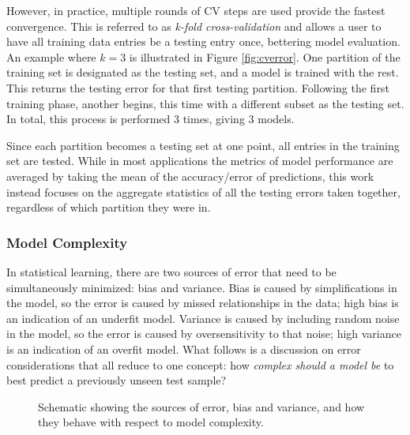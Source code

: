 However, in practice, multiple rounds of \gls{CV} steps are used provide the
fastest convergence.  This is referred to as \textit{k-fold cross-validation}
and allows a user to have all training data entries be a testing entry once,
bettering model evaluation.  An example where $k=3$ is illustrated in Figure
\ref{fig:cverror}.  One partition of the training set is designated as the
testing set, and a model is trained with the rest. This returns the testing
error for that first testing partition.  Following the first training phase,
another begins, this time with a different subset as the testing set.  In
total, this process is performed $3$ times, giving $3$ models.  

Since each partition becomes a testing set at one point, all entries in the
training set are tested.  While in most applications the metrics of model
performance are averaged by taking the mean of the accuracy/error of
predictions, this work instead focuses on the aggregate statistics of all the
testing errors taken together, regardless of which partition they were in.

\subsubsection{Model Complexity}
\label{sec:complexity}

In statistical learning, there are two sources of error that need to be
simultaneously minimized: bias and variance. Bias is caused by simplifications
in the model, so the error is caused by missed relationships in the data; high
bias is an indication of an underfit model.  Variance is caused by including
random noise in the model, so the error is caused by oversensitivity to that
noise; high variance is an indication of an overfit model. What follows is a
discussion on error considerations that all reduce to one concept: how
\textit{complex should a model be} to best predict a previously unseen test
sample?

\begin{figure}[!htb]
  \caption{Schematic showing the sources of error, bias and variance, and how 
           they behave with respect to model complexity.}
  \label{fig:bvtradeoff}
\end{figure}

